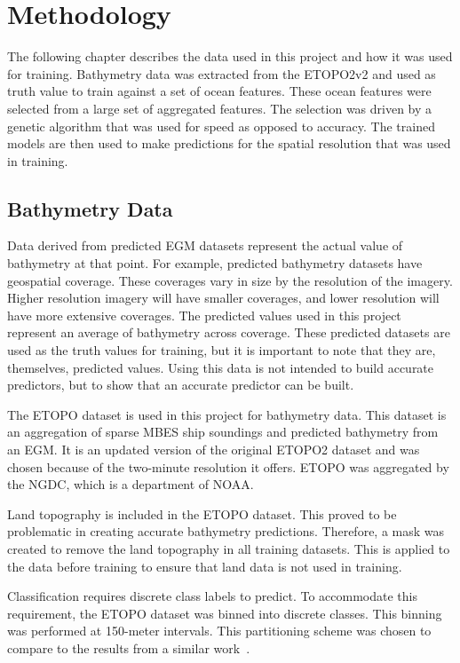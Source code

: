 \section{Methodology}
\setlength{\parindent}{10ex}
The following chapter describes the data used in this project and how it was used for training.
Bathymetry data was extracted from the \ac{ETOPO}2v2 and used as truth value to train against a set of ocean features.
These ocean features were selected from a large set of aggregated features.
The selection was driven by a genetic algorithm that was used for speed as opposed to accuracy.
The trained models are then used to make predictions for the spatial resolution that was used in training.

\subsection{Bathymetry Data}
Data derived from predicted \ac{EGM} datasets represent the actual value of bathymetry at that point.
For example, predicted bathymetry datasets have geospatial coverage.
These coverages vary in size by the resolution of the imagery.
Higher resolution imagery will have smaller coverages, and lower resolution will have more extensive coverages.
The predicted values used in this project represent an average of bathymetry across coverage. 
These predicted datasets are used as the truth values for training, but it is important to note that they are, themselves, predicted values.
Using this data is not intended to build accurate predictors, but to show that an accurate predictor can be built.

\par
The \ac{ETOPO} dataset is used in this project for bathymetry data.
This dataset is an aggregation of sparse \ac{MBES} ship soundings and predicted bathymetry from an \ac{EGM}.
It is an updated version of the original ETOPO2 dataset and was chosen because of the two-minute resolution it offers.
\ac{ETOPO} was aggregated by the \ac{NGDC}, which is a department of \ac{NOAA}.

\par
Land topography is included in the \ac{ETOPO} dataset.
This proved to be problematic in creating accurate bathymetry predictions.
Therefore, a mask was created to remove the land topography in all training datasets.
This is applied to the data before training to ensure that land data is not used in training.

\par
Classification requires discrete class labels to predict.
To accommodate this requirement, the \ac{ETOPO} dataset was binned into discrete classes.
This binning was performed at 150-meter intervals.
This partitioning scheme was chosen to compare to the results from a similar work~\cite{jena2012prediction}.

